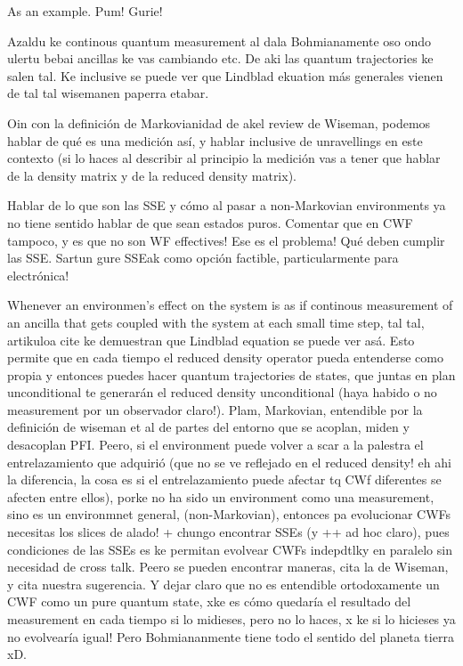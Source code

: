\documentclass[11pt, a4paper]{article} %
\begin{document}
As an example. Pum! Gurie!


\newpage
Azaldu ke continous quantum measurement al dala Bohmianamente oso ondo ulertu bebai ancillas ke vas cambiando etc. De aki las quantum trajectories ke salen tal. 
Ke inclusive se puede ver que Lindblad ekuation más generales vienen de tal tal wisemanen paperra etabar.

Oin con la definición de Markovianidad de akel review de Wiseman, podemos hablar de qué es una medición así, y hablar inclusive de unravellings en este contexto (si lo haces al describir al principio la medición vas a tener que hablar de la density matrix y de la reduced density matrix).

Hablar de lo que son las SSE y cómo al pasar a non-Markovian environments ya no tiene sentido hablar de que sean estados puros. Comentar que en CWF tampoco, y es que no son WF effectives! Ese es el problema! 
Qué deben cumplir las SSE.
Sartun gure SSEak como opción factible, particularmente para electrónica!



Whenever an environmen's effect on the system is as if continous measurement of an ancilla that gets coupled with the system at each small time step, tal tal, artikuloa cite ke demuestran que Lindblad equation se puede ver asá. Esto permite que en cada tiempo el reduced density operator pueda entenderse como propia y entonces puedes hacer quantum trajectories de states, que juntas en plan unconditional te generarán el reduced density unconditional (haya habido o no measurement por un observador claro!). Plam, Markovian, entendible por la definición de wiseman et al de partes del entorno que se acoplan, miden y desacoplan PFI. Peero, si el environment puede volver a scar a la palestra el entrelazamiento que adquirió (que no se ve reflejado en el reduced density! eh ahi la diferencia, la cosa es si el entrelazamiento puede afectar tq CWf diferentes se afecten entre ellos), porke no ha sido un environment como una measurement, sino es un environmnet general, (non-Markovian), entonces pa evolucionar CWFs necesitas los slices de alado! + chungo encontrar SSEs (y ++ ad hoc claro), pues condiciones de las SSEs es ke permitan evolvear CWFs indepdtlky en paralelo sin necesidad de cross talk. Peero se pueden encontrar maneras, cita la de Wiseman, y cita nuestra sugerencia. Y dejar claro que no es entendible ortodoxamente un CWF como un pure quantum state, xke es cómo quedaría el resultado del measurement en cada tiempo si lo midieses, pero no lo haces, x ke si lo hicieses ya no evolvearía igual! Pero Bohmiananmente tiene todo el sentido del planeta tierra xD.
\end{document}
